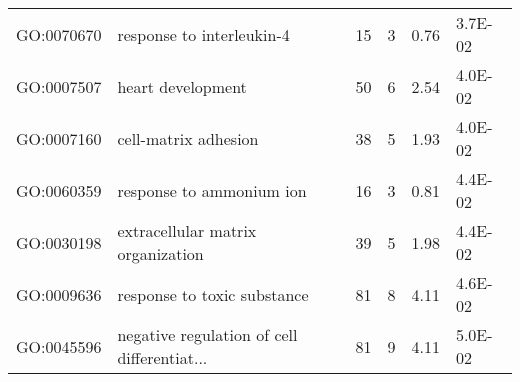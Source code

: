 \begin{table}[ht]
\begin{tabular}{llcccl}
  GO:0070670 & response to interleukin-4 &  15 &   3 & 0.76 & 3.7E-02 \\ 
  GO:0007507 & heart development &  50 &   6 & 2.54 & 4.0E-02 \\ 
  GO:0007160 & cell-matrix adhesion &  38 &   5 & 1.93 & 4.0E-02 \\ 
  GO:0060359 & response to ammonium ion &  16 &   3 & 0.81 & 4.4E-02 \\ 
  GO:0030198 & extracellular matrix organization &  39 &   5 & 1.98 & 4.4E-02 \\ 
  GO:0009636 & response to toxic substance &  81 &   8 & 4.11 & 4.6E-02 \\ 
  GO:0045596 & negative regulation of cell differentiat... &  81 &   9 & 4.11 & 5.0E-02 \\ 
   \hline
\end{tabular}
\label{Count-change, Positive}
\end{table}

